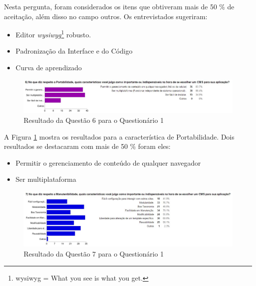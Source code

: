 Nesta pergunta, foram considerados os itens que obtiveram mais de 50 \% de aceitação, além disso no campo outros. Os entrevistados sugeriram:
\begin{itemize}
    \item Editor \textit{wysiwyg}\footnote{wysiwyg = What you see is what you get.} robusto.
    \item Padronização da Interface e do Código
    \item Curva de aprendizado
        
    \end{itemize}
    

\begin{figure}[h]
\centering
\includegraphics[keepaspectratio=true,scale=0.55]{figuras/Ques_1/q6.jpg}
\caption{Resultado da Questão 6 para o Questionário 1 }
\label{Q6_Q6}
\end{figure}

A Figura \ref{Q6_Q6} mostra os resultados para a característica de Portabilidade. Dois resultados se destacaram com mais de 50 \% foram eles:

\begin{itemize}
    \item Permitir o gerenciamento de conteúdo de qualquer navegador
    \item Ser multiplataforma        
    \end{itemize}

\begin{figure}[h]
\centering
\includegraphics[keepaspectratio=true,scale=0.55]{figuras/Ques_1/q7.jpg}
\caption{Resultado da Questão 7 para o Questionário 1}
\label{Q7_Q7}
\end{figure}

